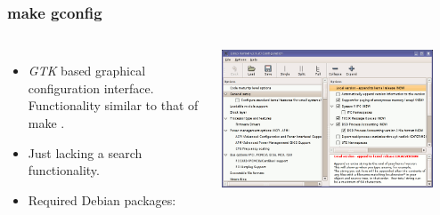 \begin{frame}
  \frametitle{make gconfig}
  \begin{columns}
    \begin{itemize}
      \item {\em GTK} based graphical configuration interface. Functionality
            similar to that of make .
      \item Just lacking a search functionality.
      \item Required Debian packages: 
    \end{itemize}
    \includegraphics[width=0.9\textwidth]{slides/sysdev-linux-intro-configuration/gconfig-screenshot.png}
  \end{columns}
\end{frame}

